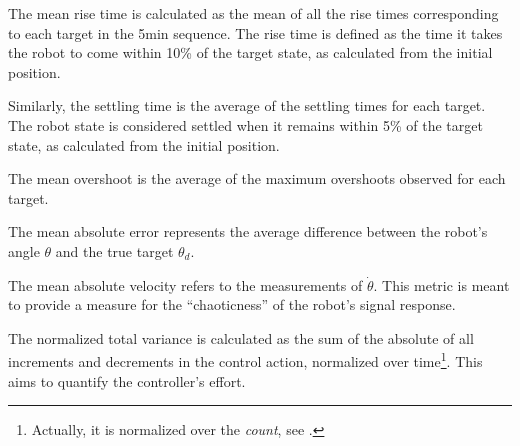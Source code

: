 The mean rise time is calculated as the mean of all the rise times corresponding to each target in the 5\si{\minute} sequence.
The rise time is defined as the time it takes the robot to come within 10\% of the target state, as calculated from the initial position.

Similarly, the settling time is the average of the settling times for each target.
The robot state is considered settled when it remains within 5\% of the target state, as calculated from the initial position.

The mean overshoot is the average of the maximum overshoots observed for each target.

The mean absolute error represents the average difference between the robot’s angle $\theta$ and the true target $\theta_d$.

The mean absolute velocity refers to the measurements of $\dot{\theta}$.
This metric is meant to provide a measure for the ``chaoticness'' of the robot's signal response.

The normalized total variance is calculated as the sum of the absolute of all increments and decrements in the control action, normalized over time\footnote{Actually, it is normalized over the \emph{count}, see .}.
This aims to quantify the controller's effort.